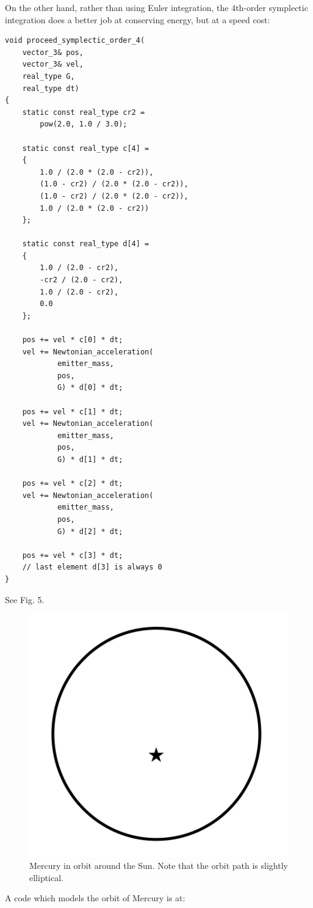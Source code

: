 \documentclass[12pt]{article}
\begin{document}
On the other hand, rather than using Euler integration, the 4th-order symplectic integration does a better job at conserving energy, but at a speed cost:
\begin{lstlisting}
void proceed_symplectic_order_4(
	vector_3& pos, 
	vector_3& vel, 
	real_type G, 
	real_type dt)
{
	static const real_type cr2 = 
		pow(2.0, 1.0 / 3.0);

	static const real_type c[4] =
	{
		1.0 / (2.0 * (2.0 - cr2)),
		(1.0 - cr2) / (2.0 * (2.0 - cr2)),
		(1.0 - cr2) / (2.0 * (2.0 - cr2)),
		1.0 / (2.0 * (2.0 - cr2))
	};

	static const real_type d[4] =
	{
		1.0 / (2.0 - cr2),
		-cr2 / (2.0 - cr2),
		1.0 / (2.0 - cr2),
		0.0
	};

	pos += vel * c[0] * dt;
	vel += Newtonian_acceleration(
			emitter_mass, 
			pos, 
			G) * d[0] * dt;

	pos += vel * c[1] * dt;
	vel += Newtonian_acceleration(
			emitter_mass, 
			pos, 
			G) * d[1] * dt;

	pos += vel * c[2] * dt;
	vel += Newtonian_acceleration(
			emitter_mass, 
			pos, 
			G) * d[2] * dt;

	pos += vel * c[3] * dt;
	// last element d[3] is always 0
}
\end{lstlisting}

See Fig. 5.
\begin{figure} 
\centering
  \includegraphics[width = 4 in]{mercury.png}
  \caption{
Mercury in orbit around the Sun.
Note that the orbit path is slightly elliptical.
}
\end{figure}

A code which models the orbit of Mercury is at:
\end{document}
